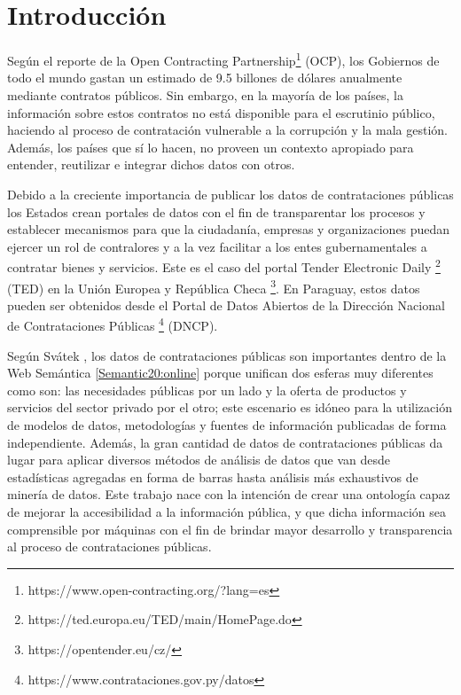 \chapter{Introducción}
\label{chap:introduccion}
Según el reporte de la Open Contracting Partnership\footnote{https://www.open-contracting.org/?lang=es} (OCP), los Gobiernos de todo el mundo gastan un estimado de 9.5 billones de dólares anualmente mediante contratos públicos. Sin embargo, en la mayoría de los países, la información sobre estos contratos no está disponible para el escrutinio público, haciendo al proceso de contratación vulnerable a la corrupción y la mala gestión. Además, los países que sí lo hacen, no proveen un contexto apropiado para entender, reutilizar e integrar dichos datos con otros.

Debido a la creciente importancia de publicar los datos de contrataciones públicas los Estados crean portales de datos con el fin de transparentar los procesos y establecer mecanismos para que la ciudadanía, empresas y organizaciones puedan ejercer un rol de contralores y a la vez facilitar a los entes gubernamentales a contratar bienes y servicios. Este es el caso del portal Tender Electronic Daily \footnote{https://ted.europa.eu/TED/main/HomePage.do} (TED) en la Unión Europea y República Checa \footnote{https://opentender.eu/cz/}. En Paraguay, estos datos pueden ser obtenidos desde el Portal de Datos Abiertos de la Dirección Nacional de Contrataciones Públicas \footnote{https://www.contrataciones.gov.py/datos} (DNCP).


Según Svátek \cite{svatek2014linked}, los datos de contrataciones públicas son importantes dentro de la Web Semántica \ref{Semantic20:online} porque unifican dos esferas muy diferentes como son: las necesidades públicas por un lado y la oferta de productos y servicios del sector privado por el otro; este escenario es idóneo para la utilización de modelos de datos, metodologías y fuentes de información publicadas de forma independiente. Además, la gran cantidad de datos de contrataciones públicas da lugar para aplicar diversos métodos de análisis de datos que van desde estadísticas agregadas en forma de barras hasta análisis más exhaustivos de minería de datos.
Este trabajo nace con la intención de crear una ontología capaz de mejorar la accesibilidad a la información pública, y que dicha información sea comprensible por máquinas con el fin de brindar mayor desarrollo y transparencia al proceso de contrataciones públicas. 



